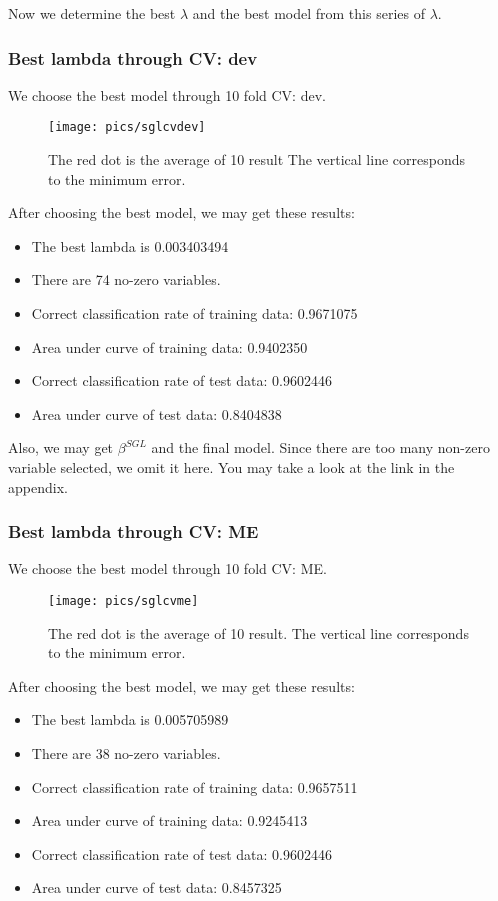 \documentclass[]{article}
\begin{document}
Now we determine the best $ \lambda $ and the best model from this series of $ \lambda $.

\subsubsection{Best lambda through CV: dev}
We choose the best model through 10 fold CV: dev.
\begin{figure}[H]
	\centering
	\texttt{[image: pics/sglcvdev]}
	\caption{The red dot is the average of 10 result The vertical line corresponds to the minimum error.\label{fig=sglcvdev}}
\end{figure}

After choosing the best model, we may get these results:
\begin{itemize}
	\item The best lambda is 0.003403494
	\item There are 74 no-zero variables.
	\item Correct classification rate of training data: 0.9671075
	\item Area under curve of training data: 0.9402350
	\item Correct classification rate of test data: 0.9602446
	\item Area under curve of test data: 0.8404838
\end{itemize}

Also, we may get $ \beta^{SGL} $ and the final model. Since there are too many non-zero variable selected, we omit it here. You may take a look at the link in the appendix.

\subsubsection{Best lambda through CV: ME}
We choose the best model through 10 fold CV: ME.
\begin{figure}[H]
	\centering
	\texttt{[image: pics/sglcvme]}
	\caption{The red dot is the average of 10 result. The vertical line corresponds to the minimum error.\label{fig=sglcvme}}
\end{figure}

After choosing the best model, we may get these results:
\begin{itemize}
	\item The best lambda is 0.005705989
	\item There are 38 no-zero variables.
	\item Correct classification rate of training data: 0.9657511
	\item Area under curve of training data: 0.9245413 
	\item Correct classification rate of test data: 0.9602446
	\item Area under curve of test data: 0.8457325
\end{itemize}
\end{document}

